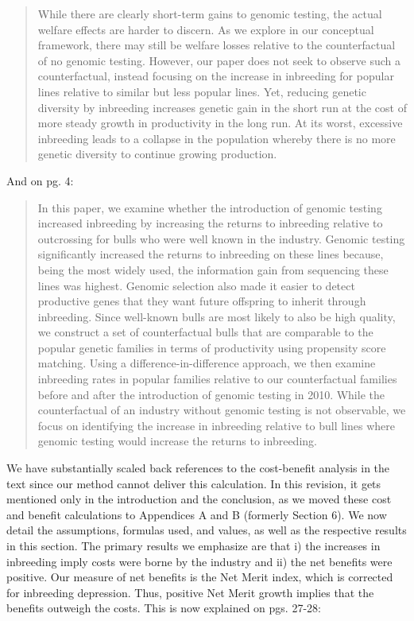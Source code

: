 \documentclass[12pt,letterpaper]{article}
\begin{document}
\begin{quote}
While there are clearly short-term gains to genomic testing, the actual welfare effects are harder to discern.
As we explore in our conceptual framework, there may still be welfare losses relative to the counterfactual of no genomic testing.
However, our paper does not seek to observe such a counterfactual, instead focusing on the increase in inbreeding for popular lines relative to similar but less popular lines.
Yet, reducing genetic diversity by inbreeding increases genetic gain in the short run at the cost of more steady growth in productivity in the long run.
At its worst, excessive inbreeding leads to a collapse in the population whereby there is no more genetic diversity to continue growing production.
\end{quote}

And on pg. 4:

\begin{quote}
In this paper, we examine whether the introduction of genomic testing increased inbreeding by increasing the returns to inbreeding relative to outcrossing for bulls who were well known in the industry.
Genomic testing significantly increased the returns to inbreeding on these lines because, being the most widely used, the information gain from sequencing these lines was highest.
Genomic selection also made it easier to detect productive genes that they want future offspring to inherit through inbreeding.
Since well-known bulls are most likely to also be high quality, we construct a set of counterfactual bulls that are comparable to the popular genetic families in terms of productivity using propensity score matching.
Using a difference-in-difference approach, we then examine inbreeding rates in popular families relative to our counterfactual families before and after the introduction of genomic testing in 2010.
While the counterfactual of an industry without genomic testing is not observable, we focus on identifying the increase in inbreeding relative to bull lines where genomic testing would increase the returns to inbreeding.
\end{quote}

We have substantially scaled back references to the cost-benefit analysis in the text since our method cannot deliver this calculation. 
In this revision, it gets mentioned only in the introduction and the conclusion, as we moved these cost and benefit calculations to Appendices A and B (formerly Section 6). We now detail the assumptions, formulas used, and values, as well as the respective results in this section. 
The primary results we emphasize are that i) the increases in inbreeding imply costs were borne by the industry and ii) the net benefits were positive.
Our measure of net benefits is the Net Merit index, which is corrected for inbreeding depression.
Thus, positive Net Merit growth implies that the benefits outweigh the costs.
This is now explained on pgs. 27-28:
\end{document}
